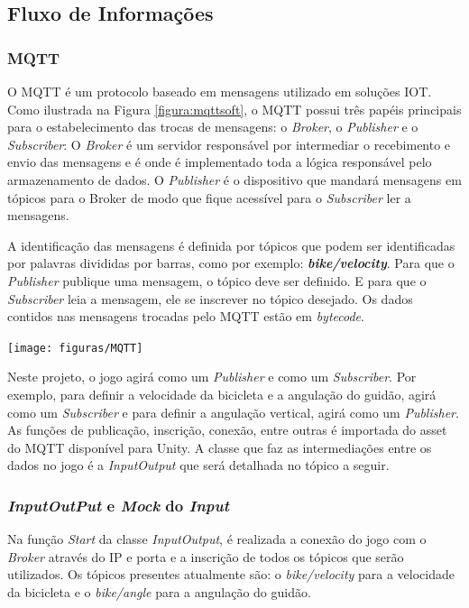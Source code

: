 \subsection{Fluxo de Informa\c{c}ões}
\subsubsection{MQTT}

O MQTT é um protocolo baseado em mensagens utilizado em soluções IOT. Como ilustrada na Figura \ref{figura:mqttsoft}, o MQTT possui três papéis principais para o estabelecimento das trocas de mensagens: o \textit{Broker}, o \textit{Publisher} e o \textit{Subscriber}: O \textit{Broker} é um servidor responsável por intermediar o recebimento e envio das mensagens e é onde é implementado toda a lógica responsável pelo armazenamento de dados. O \textit{Publisher} é o dispositivo que mandará mensagens em tópicos para o Broker de modo que fique acessível para o \textit{Subscriber} ler a mensagens.

A identificação das mensagens é definida por tópicos que podem ser identificadas por palavras divididas por barras, como por exemplo: \textit{\textbf{bike/velocity}}. Para que o \textit{Publisher} publique uma mensagem, o tópico deve ser definido. E para que o \textit{Subscriber} leia a mensagem, ele se inscrever no tópico desejado. Os dados contidos nas mensagens trocadas pelo MQTT estão em \textit{bytecode}.

\begin{center}
	\texttt{[image: figuras/MQTT]}
	\label{figura:mqttsoft}
\end{center}


Neste projeto, o jogo agirá como um \textit{Publisher} e como um \textit{Subscriber}. Por exemplo, para definir a velocidade da bicicleta e a angulação do guidão, agirá como um \textit{Subscriber} e para definir a angulação vertical, agirá como um \textit{Publisher}. As funções de publicação, inscrição, conexão, entre outras é importada do asset do MQTT disponível para Unity.  A classe que faz as intermediações entre os dados no jogo é a \textit{InputOutput} que será detalhada no tópico a seguir.

\subsubsection{\textit{InputOutPut} e \textit{Mock} do \textit{Input}}

Na função \textit{Start} da classe  \textit{InputOutput}, é realizada a conexão do jogo com o \textit{Broker} através do IP e porta e a inscrição de todos os tópicos que serão utilizados. Os tópicos presentes atualmente são: o \textit{bike/velocity} para a velocidade da bicicleta e o \textit{bike/angle} para a angulação do guidão.

